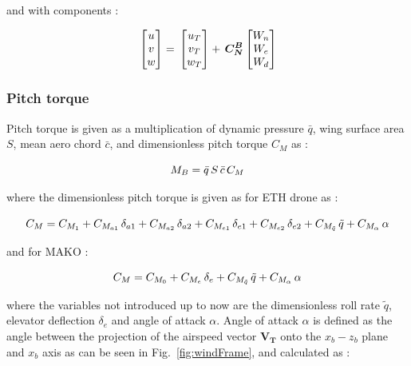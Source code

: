 and with components :

\begin{equation}{\label{eqn:inertialVelocityAirspeedVectorWindComponents}}
\begin{bmatrix}
u \\
v\\
w\\
\end{bmatrix}
=\,
\begin{bmatrix}
u_{T} \\
v_{T}\\
w_{T}\\
\end{bmatrix}
+\,
\bm{C_N^B}
\begin{bmatrix}
W_n \\
W_e\\
W_d\\
\end{bmatrix}
\end{equation}


\subsubsection{Pitch torque}

Pitch torque is given as a multiplication of dynamic pressure $\bar{q}$, wing surface area $S$, mean aero chord $\bar{c}$,  and dimensionless pitch torque $C_M$ as :

\begin{equation}{\label{eqn:pitchTorque}}
M_B = \bar{q} \, S \, \bar{c} \, C_M
\end{equation}

where the dimensionless pitch torque is given as for ETH drone as :

\begin{equation}{\label{eqn:bigCraftC_M}}
C_M = C_{M_{1}} + C_{M_{a1}} \, \delta_{a1} + C_{M_{a2}} \, \delta_{a2} + C_{M_{e1}} \, \delta_{e1} + C_{M_{e2}} \, \delta_{e2} + C_{M_{\tilde{q}}} \, \tilde{q} +  C_{M_\alpha} \, \alpha 
\end{equation}

and for MAKO :

\begin{equation}{\label{eqn:makoC_M}}
C_M =  C_{M_{0}} + C_{M_{e}} \, \delta_{e} + C_{M_{\tilde{q}}} \, \tilde{q} +  C_{M_\alpha} \, \alpha 
\end{equation}

where the variables not introduced up to now are the dimensionless roll rate $\tilde{q}$, elevator deflection $\delta_{e}$ and angle of attack $\alpha$. Angle of attack $\alpha$ is defined as the angle between the projection of the airspeed vector $\bm{V_T}$ onto the $x_b-z_b$ plane and $x_b$ axis as can be seen in Fig.~\ref{fig:windFrame}, and calculated as :

